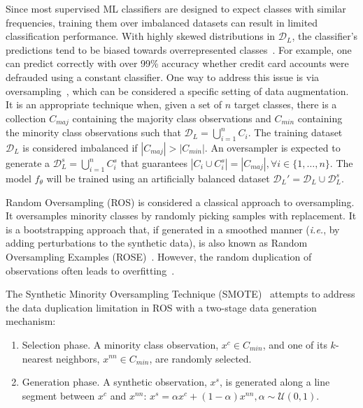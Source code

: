 Since most supervised ML classifiers are designed to expect classes with
similar frequencies, training them over imbalanced datasets can result in
limited classification performance.  With highly skewed distributions in
$\mathcal{D}_L$, the classifier’s predictions tend to be biased towards
overrepresented classes~\cite{Fonseca2021}. For example, one can
predict correctly with over 99\% accuracy whether credit card accounts were
defrauded using a constant classifier. One way to address this issue is
via oversampling~\cite{Douzas2019rs}, which can
be considered a specific setting of data augmentation.
It is an appropriate technique when, given a set of $n$ target
classes, there is a collection $C_{maj}$ containing the majority class
observations and $C_{min}$ containing the minority class observations such
that $\mathcal{D}_L = \bigcup^n_{i=1} C_i$. The training dataset
$\mathcal{D}_L$ is considered imbalanced if $|C_{maj}| > |C_{min}|$.
An oversampler is expected to generate a $\mathcal{D}_L^s = \bigcup^n_{i=1} C_i^s$
that guarantees $|C_i \cup C_i^s| = |C_{maj}|, \forall i \in \{1, \ldots,
n\}$. The model $f_\theta$ will be trained using an artificially balanced
dataset $\mathcal{D}_L' = \mathcal{D}_L \cup \mathcal{D}_L^s$.

Random Oversampling (ROS) is considered a classical approach to oversampling.
It oversamples minority classes by randomly picking samples with replacement.
It is a bootstrapping approach that, if generated in a smoothed manner
(\textit{i.e.}, by adding perturbations to the synthetic data), is also
known as Random Oversampling Examples (ROSE)~\cite{menardi2014training}.
However, the random duplication of observations often leads to
overfitting~\cite{Krawczyk2016}.

The Synthetic Minority Oversampling Technique (SMOTE)~\cite{Chawla2002}
attempts to address the data duplication limitation in ROS with a two-stage 
data generation mechanism:

\begin{enumerate}

    \item Selection phase. A minority class observation, $x^c \in C_{min}$,
        and one of its $k$-nearest neighbors, $x^{nn} \in C_{min}$, are
        randomly selected.

    \item Generation phase. A synthetic observation, $x^s$, is generated along
        a line segment between $x^c$ and $x^{nn}$: $x^s = \alpha x^c +
        (1-\alpha)x^{nn}, \alpha \sim \mathcal{U}(0, 1)$.

\end{enumerate}

